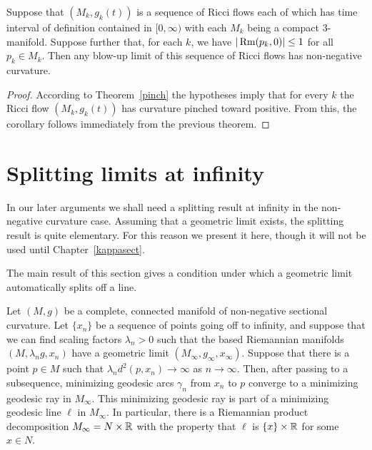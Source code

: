 \begin{corollary}\label{cor:blow-up-limit-nonnegative-curvature-pinched}


Suppose that $(M_k,g_k(t))$ is a sequence of Ricci flows each of which has time
interval of definition contained in $[0,\infty)$ with each $M_k$ being a
compact $3$-manifold. Suppose further that, for each $k$, we have $|\operatorname{Rm}(p_k,0)|\le 1$ for all $p_k\in M_k$. Then any blow-up limit of this sequence
of Ricci flows has non-negative curvature.
\end{corollary}


\begin{proof}
\sketch
{}
According to Theorem~\ref{pinch} the hypotheses imply that for every $k$ the
Ricci flow $(M_k,g_k(t))$ has curvature pinched toward positive. From this, the
corollary follows immediately from the previous theorem.
\end{proof}

\section{Splitting limits at infinity}

In our later arguments we shall need a splitting result at infinity
in the non-negative curvature case. Assuming that a geometric limit
exists, the splitting result is quite elementary. For this reason we
present it here, though it will not be used until
Chapter~\ref{kappasect}.



The main result of this section gives a condition under which a geometric limit
automatically splits off a line.

\begin{theorem}\label{thm:splitting-at-infinity}

\label{topsplit}

Let $(M,g)$ be a complete, connected manifold of non-negative
sectional curvature. Let $\{x_n\}$ be a sequence of points going off
to infinity, and suppose that we can find scaling factors
$\lambda_n>0$ such that the based Riemannian manifolds
$(M,\lambda_ng,x_n)$ have a geometric limit
$(M_\infty,g_\infty,x_\infty)$. Suppose that there is a point $p\in
M$ such that $\lambda_nd^2(p,x_n)\rightarrow \infty$ as
$n\rightarrow\infty$.  Then, after passing to a subsequence,
minimizing geodesic arcs $\gamma_n$ from $x_n$ to $p$ converge to a
minimizing geodesic ray in $M_\infty$. This minimizing geodesic ray
is part of a minimizing geodesic line $\ell$ in $M_\infty$. In
particular, there is a Riemannian product decomposition
$M_\infty=N\times \mathbb{R}$ with the property that $\ell$ is $\{x\}\times
\mathbb{R}$ for some $x\in N$.
\end{theorem}


